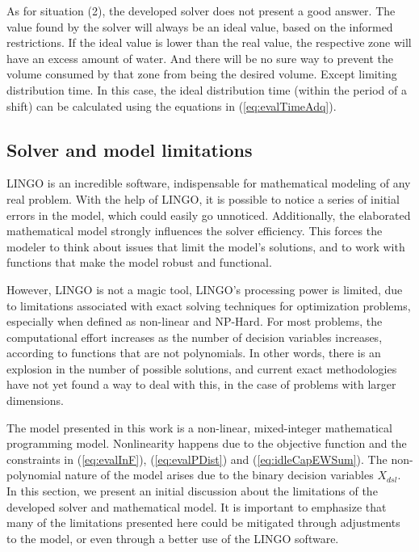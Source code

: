 \documentclass{singlecol}
\theoremstyle{TH}{
\newtheorem{lemma}{Lemma}
\newtheorem{theorem}[lemma]{Theorem}
\newtheorem{corrolary}[lemma]{Corrolary}
\newtheorem{conjecture}[lemma]{Conjecture}
\newtheorem{proposition}[lemma]{Proposition}
\newtheorem{claim}[lemma]{Claim}
\newtheorem{stheorem}[lemma]{Wrong Theorem}
\newtheorem{algorithm}{Algorithm}
}
\theoremstyle{THrm}{
\newtheorem{definition}{Definition}[section]
\newtheorem{question}{Question}[section]
\newtheorem{remark}{Remark}
\newtheorem{scheme}{Scheme}
}
\theoremstyle{THhit}{
\newtheorem{case}{Case}[section]
}
\begin{document}
As for situation (2), the developed solver does not present a good answer. The value found by the solver will always be an ideal value, based on the informed restrictions. If the ideal value is lower than the real value, the respective zone will have an excess amount of water. And there will be no sure way to prevent the volume consumed by that zone from being the desired volume. Except limiting distribution time. In this case, the ideal distribution time (within the period of a shift) can be calculated using the equations in (\ref{eq:evalTimeAdq}). 

\subsection{Solver and model limitations}
\label{sec:limitations}

LINGO is an incredible software, indispensable for mathematical modeling of any real problem. With the help of LINGO, it is possible to notice a series of initial errors in the model, which could easily go unnoticed. Additionally, the elaborated mathematical model strongly influences the solver efficiency. This forces the modeler to think about issues that limit the model's solutions, and to work with functions that make the model robust and functional.

However, LINGO is not a magic tool, LINGO's processing power is limited, due to limitations associated with exact solving techniques for optimization problems, especially when defined as non-linear and NP-Hard. For most problems, the computational effort increases as the number of decision variables increases, according to functions that are not polynomials. In other words, there is an explosion in the number of possible solutions, and current exact methodologies have not yet found a way to deal with this, in the case of problems with larger dimensions. 

\label{nonlinerarityExp}{The model presented in this work is a non-linear, mixed-integer mathematical programming model. Nonlinearity happens due to the objective function and the constraints in} (\ref{eq:evalInF}), (\ref{eq:evalPDist}) and (\ref{eq:idleCapEWSum}). The non-polynomial nature of the model arises due to the binary decision variables $X_{dsl}$. In this section, we present an initial discussion about the limitations of the developed solver and mathematical model. It is important to emphasize that many of the limitations presented here could be mitigated through adjustments to the model, or even through a better use of the LINGO software. 
\end{document}
